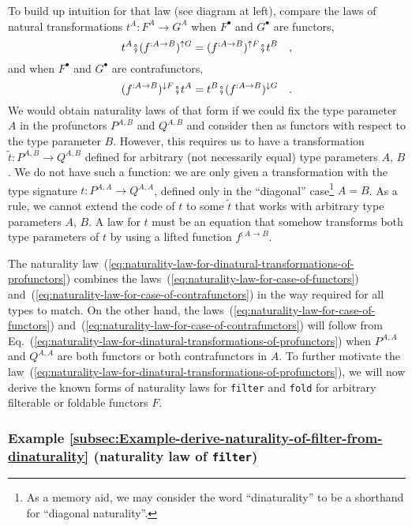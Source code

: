 To build up intuition for that law (see diagram at left), compare
the laws of natural transformations $t^{A}:F^{A}\rightarrow G^{A}$
when $F^{\bullet}$ and $G^{\bullet}$ are functors,
\begin{equation}
t^{A}\bef(f^{:A\rightarrow B})^{\uparrow G}=(f^{:A\rightarrow B})^{\uparrow F}\bef t^{B}\quad,\label{eq:naturality-law-for-case-of-functors}
\end{equation}
and when $F^{\bullet}$ and $G^{\bullet}$ are contrafunctors,
\begin{equation}
(f^{:A\rightarrow B})^{\downarrow F}\bef t^{A}=t^{B}\bef(f^{:A\rightarrow B})^{\downarrow G}\quad.\label{eq:naturality-law-for-case-of-contrafunctors}
\end{equation}
We would obtain naturality laws of that form if we could fix the type
parameter $A$ in the profunctors $P^{A,B}$ and $Q^{A,B}$ and consider
then as functors with respect to the type parameter $B$. However,
this requires us to have a transformation $\tilde{t}:P^{A,B}\rightarrow Q^{A,B}$
defined for arbitrary (not necessarily equal) type parameters $A$,
$B$. We do not have such a function: we are only given a transformation
with the type signature $t:P^{A,A}\rightarrow Q^{A,A}$, defined only
in the ``diagonal'' case\footnote{As a memory aid, we may consider the word ``dinaturality'' to be
a shorthand for ``diagonal naturality''.} $A=B$. As a rule, we cannot extend the code of $t$ to some $\tilde{t}$
that works with arbitrary type parameters $A$, $B$. A law for $t$
must be an equation that somehow transforms both type parameters of
$t$ by using a lifted function $f^{:A\rightarrow B}$. 

The naturality law~(\ref{eq:naturality-law-for-dinatural-transformations-of-profunctors})
combines the laws~(\ref{eq:naturality-law-for-case-of-functors})
and~(\ref{eq:naturality-law-for-case-of-contrafunctors}) in the
way required for all types to match. On the other hand, the laws~(\ref{eq:naturality-law-for-case-of-functors})
and~(\ref{eq:naturality-law-for-case-of-contrafunctors}) will follow
from Eq.~(\ref{eq:naturality-law-for-dinatural-transformations-of-profunctors})
when $P^{A,A}$ and $Q^{A,A}$ are both functors or both contrafunctors
in $A$. To further motivate the law~(\ref{eq:naturality-law-for-dinatural-transformations-of-profunctors}),
we will now derive the known forms of naturality laws for \lstinline!filter!
and \lstinline!fold! for arbitrary filterable or foldable functors
$F$.

\subsubsection{Example \label{subsec:Example-derive-naturality-of-filter-from-dinaturality}\ref{subsec:Example-derive-naturality-of-filter-from-dinaturality}
(naturality law of \lstinline!filter!)}

